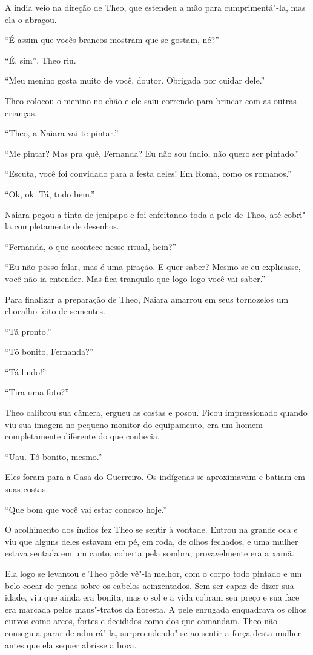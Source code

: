 A índia veio na direção de Theo, que estendeu a mão para cumprimentá"-la,
mas ela o abraçou.

``É assim que vocês brancos mostram que se gostam, né?''

``É, sim'', Theo riu.

``Meu menino gosta muito de você, doutor. Obrigada por cuidar dele.''

Theo colocou o menino no chão e ele saiu correndo para brincar com as
outras crianças.

``Theo, a Naiara vai te pintar.''

``Me pintar? Mas pra quê, Fernanda? Eu não sou índio, não quero ser
pintado.''

``Escuta, você foi convidado para a festa deles! Em Roma, como os
romanos.''

``Ok, ok. Tá, tudo bem.''

Naiara pegou a tinta de jenipapo e foi enfeitando toda a pele de Theo,
até cobri"-la completamente de desenhos.

``Fernanda, o que acontece nesse ritual, hein?''

``Eu não posso falar, mas é uma piração. E quer saber? Mesmo se eu
explicasse, você não ia entender. Mas fica tranquilo que logo logo você
vai saber.''

Para finalizar a preparação de Theo, Naiara amarrou em seus tornozelos
um chocalho feito de sementes.

``Tá pronto.''

``Tô bonito, Fernanda?''

``Tá lindo!''

``Tira uma foto?''

Theo calibrou sua câmera, ergueu as costas e posou. Ficou impressionado
quando viu sua imagem no pequeno monitor do equipamento, era um homem
completamente diferente do que conhecia.

``Uau. Tô bonito, mesmo.''

Eles foram para a Casa do Guerreiro. Os indígenas se aproximavam e
batiam em suas costas.

``Que bom que você vai estar conosco hoje.''

O acolhimento dos índios fez Theo se sentir à vontade. Entrou na
grande oca e viu que alguns deles estavam em pé, em roda, de olhos
fechados, e uma mulher estava sentada em um canto, coberta pela sombra,
provavelmente era a xamã.

Ela logo se levantou e Theo pôde vê"-la melhor, com o corpo todo pintado
e um belo cocar de penas sobre os cabelos acinzentados. Sem ser capaz de
dizer sua idade, viu que ainda era bonita, mas o sol e a vida cobram seu
preço e sua face era marcada pelos maus"-tratos da floresta. A pele
enrugada enquadrava os olhos curvos como arcos, fortes e decididos como
dos que comandam. Theo não conseguia parar de admirá"-la,
surpreendendo"-se ao sentir a força desta mulher antes que ela sequer
abrisse a boca.

